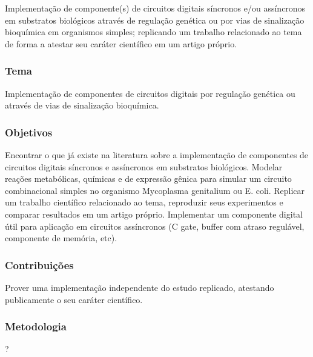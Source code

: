 
Implementação de componente(s) de circuitos digitais síncronos e/ou assíncronos em substratos biológicos através de regulação genética ou por vias de sinalização bioquímica em organismos simples;
replicando um trabalho relacionado ao tema de forma a atestar seu caráter científico em um artigo próprio.


\subsubsection{Tema}

Implementação de componentes de circuitos digitais por regulação genética ou através de vias de sinalização bioquímica.


\subsubsection{Objetivos}

Encontrar o que já existe na literatura sobre a implementação de componentes de circuitos digitais síncronos e assíncronos em substratos biológicos.
Modelar reações metabólicas, químicas e de expressão gênica para simular um circuito combinacional simples no organismo Mycoplasma genitalium ou E. coli.
Replicar um trabalho científico relacionado ao tema, reproduzir seus experimentos e comparar resultados em um artigo próprio.
Implementar um componente digital útil para aplicação em circuitos assíncronos (C gate, buffer com atraso regulável, componente de memória, etc).


\subsubsection{Contribuições}

Prover uma implementação independente do estudo replicado, atestando publicamente o seu caráter científico.


\subsubsection{Metodologia}

?
